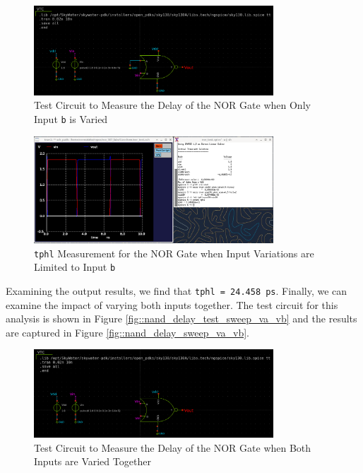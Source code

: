 \documentclass[fleqn]{article}
\begin{document}
	\begin{figure}[H]
		\centerline{\includegraphics[width=0.8\textwidth]{nor_delay_test_sweep_vb.png}}
		\caption{Test Circuit to Measure the Delay of the NOR Gate when Only Input \texttt{b} is Varied}
		\label{fig::nor_delay_test_sweep_vb}
	\end{figure}
	
	\begin{figure}[H]
		\centerline{\includegraphics[width=0.8\textwidth]{nor_delay_sweep_vb.png}}
		\caption{\texttt{tphl} Measurement for the NOR Gate when Input Variations are Limited to Input \texttt{b}}
		\label{fig::nor_delay_sweep_vb}
	\end{figure}
	
	Examining the output results, we find that \texttt{tphl = 24.458 ps}. Finally, we can examine the impact of varying both inputs together. The test circuit for this analysis is shown in Figure  \ref{fig::nand_delay_test_sweep_va_vb} and the results are captured in Figure  \ref{fig::nand_delay_sweep_va_vb}.
	
	\begin{figure}[H]
		\centerline{\includegraphics[width=0.8\textwidth]{nor_delay_test_sweep_va_vb.png}}
		\caption{Test Circuit to Measure the Delay of the NOR Gate when Both Inputs are Varied Together}
		\label{fig::nor_delay_test_sweep_va_vb}
	\end{figure}
	
\end{document}
